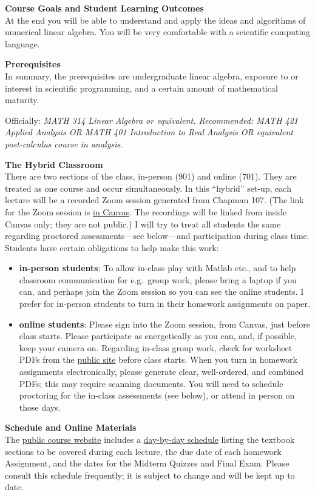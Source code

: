 \documentclass[12pt]{article}
\renewcommand{\emph}[1]{\textsf{\textbf{#1}}}
\newcommand{\localhead}[1]{\par\smallskip\textbf{#1} \smallskip\nobreak\\}%
\def\heading#1{\localhead{\large\emph{#1}}}
\begin{document}
\heading{Course Goals and Student Learning Outcomes}
At the end you will be able to understand and apply the ideas and algorithms of numerical linear algebra.  You will be very comfortable with a scientific computing language.


\clearpage \newpage
\phantom{foo}
\heading{Prerequisites}
In summary, the prerequisites are undergraduate linear algebra, exposure to or interest in scientific programming, and a certain amount of mathematical maturity.

Officially: \textsl{MATH 314 Linear Algebra or equivalent.  Recommended: MATH 421 Applied Analysis OR MATH 401 Introduction to Real Analysis OR equivalent post-calculus course in analysis.}


\heading{The Hybrid Classroom}
There are two sections of the class, in-person (901) and online (701).  They are treated as one course and occur simultaneously.  In this ``hybrid'' set-up, each lecture will be a recorded Zoom session generated from Chapman 107.  (The link for the Zoom session is \href{https://canvas.alaska.edu/courses/15800}{in Canvas}.  The recordings will be linked from inside Canvas only; they are not public.)  I will try to treat all students the same regarding proctored assessments---see below---and participation during class time.  Students have certain obligations to help make this work:
\begin{itemize}
\item \textbf{in-person students}: To allow in-class play with Matlab etc., and to help classroom communication for e.g.~group work, please bring a laptop if you can, and perhaps join the Zoom session so you can see the online students.  I prefer for in-person students to turn in their homework assignments on paper.
\item \textbf{online students}: Please sign into the Zoom session, from Canvas, just before class starts.  Please participate as energetically as you can, and, if possible, keep your camera on.  Regarding in-class group work, check for worksheet PDFs from the \href{https://bueler.github.io/nla/}{public site} before class starts.  When you turn in homework assignments electronically, please generate clear, well-ordered, and combined PDFs; this may require scanning documents.  You will need to schedule proctoring for the in-class assessments (see below), or attend in person on those days.
\end{itemize}


\heading{Schedule and Online Materials}
The \href{https://bueler.github.io/nla/}{public course website} includes a \href{https://bueler.github.io/nla/assets/general/F23/schedule.pdf}{day-by-day schedule} listing the textbook sections to be covered during each lecture, the due date of each homework Assignment, and the dates for the Midterm Quizzes and Final Exam.  Please consult this schedule frequently; it is subject to change and will be kept up to date.
\end{document}
